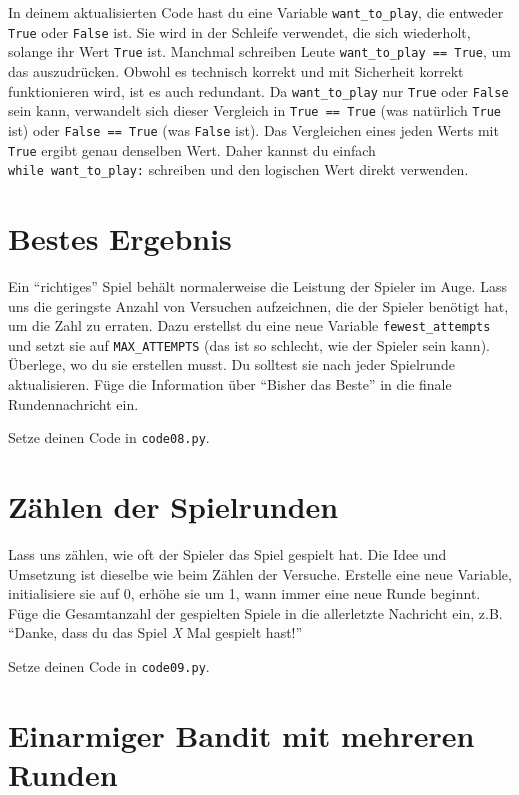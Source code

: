 \documentclass[
]{book}
\begin{document}
In deinem aktualisierten Code hast du eine Variable \texttt{want\_to\_play}, die entweder \texttt{True} oder \texttt{False} ist. Sie wird in der Schleife verwendet, die sich wiederholt, solange ihr Wert \texttt{True} ist. Manchmal schreiben Leute \texttt{want\_to\_play\ ==\ True}, um das auszudrücken. Obwohl es technisch korrekt und mit Sicherheit korrekt funktionieren wird, ist es auch redundant. Da \texttt{want\_to\_play} nur \texttt{True} oder \texttt{False} sein kann, verwandelt sich dieser Vergleich in \texttt{True\ ==\ True} (was natürlich \texttt{True} ist) oder \texttt{False\ ==\ True} (was \texttt{False} ist). Das Vergleichen eines jeden Werts mit \texttt{True} ergibt genau denselben Wert. Daher kannst du einfach \texttt{while\ want\_to\_play:} schreiben und den logischen Wert direkt verwenden.

\hypertarget{bestes-ergebnis}{%
\section{Bestes Ergebnis}\label{bestes-ergebnis}}

Ein ``richtiges'' Spiel behält normalerweise die Leistung der Spieler im Auge. Lass uns die geringste Anzahl von Versuchen aufzeichnen, die der Spieler benötigt hat, um die Zahl zu erraten. Dazu erstellst du eine neue Variable \texttt{fewest\_attempts} und setzt sie auf \texttt{MAX\_ATTEMPTS} (das ist so schlecht, wie der Spieler sein kann). Überlege, wo du sie erstellen musst. Du solltest sie nach jeder Spielrunde aktualisieren. Füge die Information über ``Bisher das Beste'' in die finale Rundennachricht ein.

Setze deinen Code in \texttt{code08.py}.

\hypertarget{zuxe4hlen-der-spielrunden}{%
\section{Zählen der Spielrunden}\label{zuxe4hlen-der-spielrunden}}

Lass uns zählen, wie oft der Spieler das Spiel gespielt hat. Die Idee und Umsetzung ist dieselbe wie beim Zählen der Versuche. Erstelle eine neue Variable, initialisiere sie auf 0, erhöhe sie um 1, wann immer eine neue Runde beginnt. Füge die Gesamtanzahl der gespielten Spiele in die allerletzte Nachricht ein, z.B. ``Danke, dass du das Spiel \emph{X} Mal gespielt hast!''

Setze deinen Code in \texttt{code09.py}.

\hypertarget{einarmiger-bandit-mit-mehreren-runden}{%
\section{Einarmiger Bandit mit mehreren Runden}\label{einarmiger-bandit-mit-mehreren-runden}}
\end{document}
